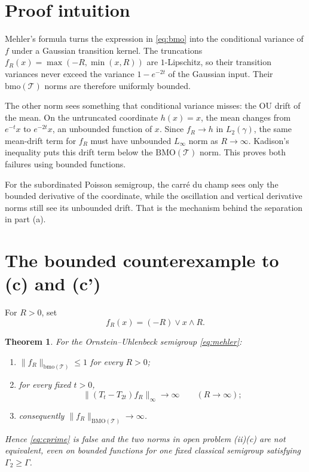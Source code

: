 \documentclass[11pt]{article}
\newtheorem{theorem}{Theorem}
\newcommand{\g}{\gamma}
\newcommand{\T}{\mathcal T}
\newcommand{\bmo}{\mathrm{bmo}}
\newcommand{\BMO}{\mathrm{BMO}}
\newcommand{\Ga}{\Gamma}
\begin{document}
\section{Proof intuition}

Mehler's formula turns the expression in \eqref{eq:bmo} into the conditional
variance of $f$ under a Gaussian transition kernel.  The truncations
$f_R(x)=\max(-R,\min(x,R))$ are $1$-Lipschitz, so their transition variances
never exceed the variance $1-e^{-2t}$ of the Gaussian input.  Their
$\bmo(\T)$ norms are therefore uniformly bounded.

The other norm sees something that conditional variance misses: the OU drift
of the mean.  On the untruncated coordinate $h(x)=x$, the mean changes from
$e^{-t}x$ to $e^{-2t}x$, an unbounded function of $x$.  Since $f_R\to h$ in
$L_2(\g)$, the same mean-drift term for $f_R$ must have unbounded
$L_\infty$ norm as $R\to\infty$.  Kadison's inequality puts this drift term
below the $\BMO(\T)$ norm.  This proves both failures using bounded functions.

For the subordinated Poisson semigroup, the carré du champ sees only the
bounded derivative of the coordinate, while the oscillation and vertical
derivative norms still see its unbounded drift.  That is the mechanism behind
the separation in part (a).

\section{The bounded counterexample to (c) and (c')}

For $R>0$, set
\begin{equation}\label{eq:trunc}
 f_R(x)=(-R)\vee x\wedge R.
\end{equation}

\begin{theorem}\label{thm:main}
For the Ornstein--Uhlenbeck semigroup \eqref{eq:mehler}:
\begin{enumerate}[label=\textup{(\roman*)},leftmargin=2.3em]
\item $\|f_R\|_{\bmo(\T)}\leq1$ for every $R>0$;
\item for every fixed $t>0$,
\[
 \|(T_t-T_{2t})f_R\|_\infty\longrightarrow\infty
 \qquad(R\to\infty);
\]
\item consequently $\|f_R\|_{\BMO(\T)}\to\infty$.
\end{enumerate}
Hence \eqref{eq:cprime} is false and the two norms in open problem (ii)(c)
are not equivalent, even on bounded functions for one fixed classical
semigroup satisfying $\Ga_2\geq\Ga$.
\end{theorem}
\end{document}
